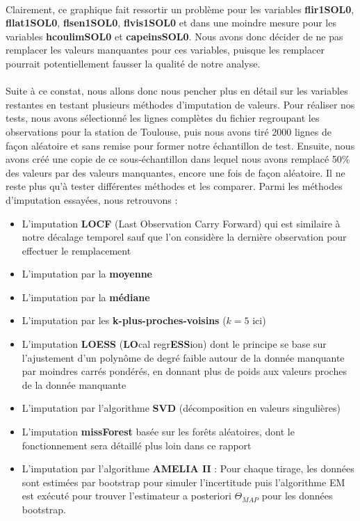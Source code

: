 \documentclass[14pt, openany]{article}
\begin{document}
\paragraph{}
Clairement, ce graphique fait ressortir un problème pour les variables \textbf{flir1SOL0}, \textbf{fllat1SOL0}, \textbf{flsen1SOL0}, \textbf{flvis1SOL0} et dans une moindre mesure pour les variables \textbf{hcoulimSOL0} et \textbf{capeinsSOL0}. Nous avons donc décider de ne pas remplacer les valeurs manquantes pour ces variables, puisque les remplacer pourrait potentiellement fausser la qualité de notre analyse.
\paragraph{}
Suite à ce constat, nous allons donc nous pencher plus en détail sur les variables restantes en testant plusieurs méthodes d'imputation de valeurs. Pour réaliser nos tests, nous avons sélectionné les lignes complètes du fichier regroupant les observations pour la station de Toulouse, puis nous avons tiré 2000 lignes de façon aléatoire et sans remise pour former notre échantillon de test. Ensuite, nous avons créé une copie de ce sous-échantillon dans lequel nous avons remplacé 50\% des valeurs par des valeurs manquantes, encore une fois de façon aléatoire. Il ne reste plus qu'à tester différentes méthodes et les comparer.
\newpage
Parmi les méthodes d'imputation essayées, nous retrouvons :
\begin{itemize}
\item L'imputation \textbf{LOCF} (Last Observation Carry Forward) qui est similaire à notre décalage temporel sauf que l'on considère la dernière observation pour effectuer le remplacement
\item L'imputation par la \textbf{moyenne}
\item L'imputation par la \textbf{médiane}
\item L'imputation par les \textbf{k-plus-proches-voisins} ($k=5$ ici)
\item L'imputation \textbf{LOESS} (\textbf{LO}cal regr\textbf{ESS}ion) dont le principe se base sur l'ajustement d'un polynôme de degré faible autour de la donnée manquante par moindres carrés pondérés, en donnant plus de poids aux valeurs proches de la donnée manquante
\item L'imputation par l'algorithme \textbf{SVD} (décomposition en valeurs singulières)
\item L'imputation \textbf{missForest} basée sur les forêts aléatoires, dont le fonctionnement sera détaillé plus loin dans ce rapport
\item L'imputation par l'algorithme \textbf{AMELIA II} : Pour chaque tirage, les données sont estimées par bootstrap pour simuler l'incertitude puis l'algorithme EM est exécuté pour trouver l'estimateur a posteriori $\Theta_{MAP}$ pour les données bootstrap.
\end{itemize}
\end{document}
